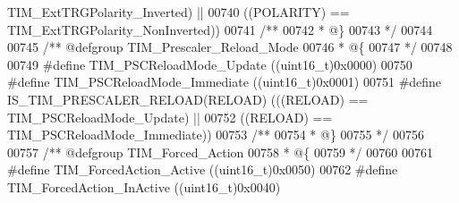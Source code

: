 \begin{DoxyCode}
      TIM_ExtTRGPolarity_Inverted\textcolor{preprocessor}{)} \textcolor{preprocessor}{||}
00740                                        \textcolor{preprocessor}{(}\textcolor{preprocessor}{(}\textcolor{preprocessor}{POLARITY}\textcolor{preprocessor}{)} \textcolor{preprocessor}{==} 
      TIM_ExtTRGPolarity_NonInverted\textcolor{preprocessor}{)}\textcolor{preprocessor}{)}
00741 \textcolor{comment}{/**}
00742 \textcolor{comment}{  * @\}}
00743 \textcolor{comment}{  */}
00744 
00745 \textcolor{comment}{/** @defgroup TIM\_Prescaler\_Reload\_Mode }
00746 \textcolor{comment}{  * @\{}
00747 \textcolor{comment}{  */}
00748 
00749 \textcolor{preprocessor}{#}\textcolor{preprocessor}{define} \textcolor{preprocessor}{TIM\_PSCReloadMode\_Update}           \textcolor{preprocessor}{(}\textcolor{preprocessor}{(}\textcolor{preprocessor}{uint16\_t}\textcolor{preprocessor}{)}0x0000\textcolor{preprocessor}{)}
00750 \textcolor{preprocessor}{#}\textcolor{preprocessor}{define} \textcolor{preprocessor}{TIM\_PSCReloadMode\_Immediate}        \textcolor{preprocessor}{(}\textcolor{preprocessor}{(}\textcolor{preprocessor}{uint16\_t}\textcolor{preprocessor}{)}0x0001\textcolor{preprocessor}{)}
00751 \textcolor{preprocessor}{#}\textcolor{preprocessor}{define} \textcolor{preprocessor}{IS\_TIM\_PRESCALER\_RELOAD}\textcolor{preprocessor}{(}\textcolor{preprocessor}{RELOAD}\textcolor{preprocessor}{)} \textcolor{preprocessor}{(}\textcolor{preprocessor}{(}\textcolor{preprocessor}{(}\textcolor{preprocessor}{RELOAD}\textcolor{preprocessor}{)} \textcolor{preprocessor}{==} 
      TIM_PSCReloadMode_Update\textcolor{preprocessor}{)} \textcolor{preprocessor}{||}
00752                                          \textcolor{preprocessor}{(}\textcolor{preprocessor}{(}\textcolor{preprocessor}{RELOAD}\textcolor{preprocessor}{)} \textcolor{preprocessor}{==} 
      TIM_PSCReloadMode_Immediate\textcolor{preprocessor}{)}\textcolor{preprocessor}{)}
00753 \textcolor{comment}{/**}
00754 \textcolor{comment}{  * @\}}
00755 \textcolor{comment}{  */}
00756 
00757 \textcolor{comment}{/** @defgroup TIM\_Forced\_Action }
00758 \textcolor{comment}{  * @\{}
00759 \textcolor{comment}{  */}
00760 
00761 \textcolor{preprocessor}{#}\textcolor{preprocessor}{define} \textcolor{preprocessor}{TIM\_ForcedAction\_Active}            \textcolor{preprocessor}{(}\textcolor{preprocessor}{(}\textcolor{preprocessor}{uint16\_t}\textcolor{preprocessor}{)}0x0050\textcolor{preprocessor}{)}
00762 \textcolor{preprocessor}{#}\textcolor{preprocessor}{define} \textcolor{preprocessor}{TIM\_ForcedAction\_InActive}          \textcolor{preprocessor}{(}\textcolor{preprocessor}{(}\textcolor{preprocessor}{uint16\_t}\textcolor{preprocessor}{)}0x0040\textcolor{preprocessor}{)}

\end{DoxyCode}

